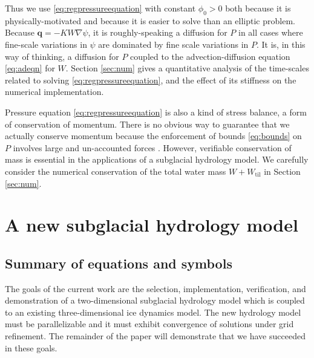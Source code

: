 \documentclass[11pt,final]{amsart}
\newcommand\bq{\mathbf{q}}
\newcommand{\grad}{\nabla}
\newcommand{\Wtil}{W_{\text{til}}}
\begin{document}
Thus we use \eqref{eq:regpressureequation} with constant $\phi_0>0$ both because it is physically-motivated and because it is easier to solve than an elliptic problem.  Because $\bq = - K W \grad \psi$, it is roughly-speaking a diffusion for $P$ in all cases where fine-scale variations in $\psi$ are dominated by fine scale variations in $P$.  It is, in this way of thinking, a diffusion for $P$ coupled to the advection-diffusion equation \eqref{eq:adeqn} for $W$.  Section \ref{sec:num} gives a quantitative analysis of the time-scales related to solving \eqref{eq:regpressureequation}, and the effect of its stiffness on the numerical implementation.

Pressure equation \eqref{eq:regpressureequation} is also a kind of stress balance, a form of conservation of momentum.  There is no obvious way to guarantee that we actually conserve momentum because the enforcement of bounds \eqref{eq:bounds} on $P$ involves large and un-accounted forces \citep{Schoofetal2012}.  However, verifiable conservation of mass is essential in the applications of a subglacial hydrology model.  We carefully consider the numerical conservation of the total water mass $W+\Wtil$ in Section \ref{sec:num}.



\section{A new subglacial hydrology model} \label{sec:newmodel}

\subsection*{Summary of equations and symbols}  The goals of the current work are the selection, implementation, verification, and demonstration of a two-dimensional subglacial hydrology model which is coupled to an existing three-dimensional ice dynamics model.  The new hydrology model must be parallelizable and it must exhibit convergence of solutions under grid refinement.  The remainder of the paper will demonstrate that we have succeeded in these goals.
\end{document}

